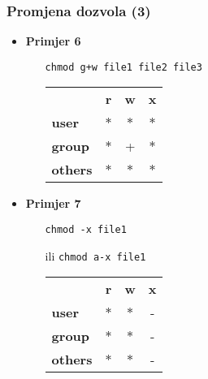 \documentclass[table,usenames,dvipsnames]{beamer}
\newcommand{\shell}[1]{\texttt{#1}}
\begin{document}
\begin{frame}[t]
	\frametitle{Promjena dozvola (3)}
\begin{itemize}
	\item \textbf{Primjer 6}
	\begin{itemize}
	    \item[] \shell{chmod g+w file1 file2 file3}
	    \item[] \hspace{1em} \begin{tabular}{l c c c}
    	& \textbf{r} & \textbf{w} & \textbf{x}\\
    	\textbf{user} & $\ast$ & $\ast$ & $\ast$\\
    	\textbf{group} & $\ast$ & + & $\ast$\\
    	\textbf{others} & $\ast$ & $\ast$ & $\ast$
		\end{tabular}
    \end{itemize}
	\item \textbf{Primjer 7}
	\begin{itemize}
	    \item[] \shell{chmod -x file1} 
	    \item[ili] \shell{chmod a-x file1}
	    \item[] \hspace{1em} \begin{tabular}{l c c c}
	        	& \textbf{r} & \textbf{w} & \textbf{x}\\
	        	\textbf{user} & $\ast$ & $\ast$ & -\\
	        	\textbf{group} & $\ast$ & $\ast$ & -\\
	        	\textbf{others} & $\ast$ & $\ast$ & -
	        \end{tabular}
    \end{itemize}
\end{itemize}
\end{frame}


\end{document}
